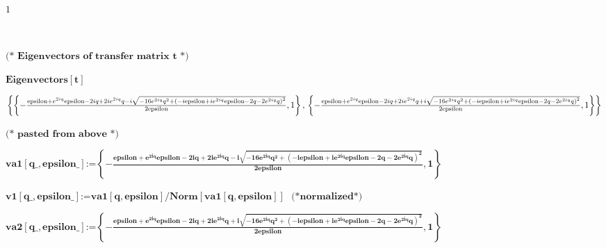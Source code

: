 {\begin{doublespace}
\noindent\(1\)
\end{doublespace}

\begin{doublespace}
\noindent\(\pmb{\text{}}\)
\end{doublespace}

\begin{doublespace}
\noindent\(\pmb{\text{(* Eigenvectors of transfer matrix t *)}}\)
\end{doublespace}

\begin{doublespace}
\noindent\(\pmb{\text{Eigenvectors}[t]}\)
\end{doublespace}

\begin{doublespace}
\noindent\(\left\{\left\{-\frac{\text{epsilon}+e^{2 i q} \text{epsilon}-2 i q+2 i e^{2 i q} q-i \sqrt{-16 e^{2 i q} q^2+\left(-i \text{epsilon}+i
e^{2 i q} \text{epsilon}-2 q-2 e^{2 i q} q\right)^2}}{2 \text{epsilon}},1\right\},
\newline
\left\{-\frac{\text{epsilon}+e^{2 i q} \text{epsilon}-2 i q+2 i
e^{2 i q} q+i \sqrt{-16 e^{2 i q} q^2+\left(-i \text{epsilon}+i e^{2 i q} \text{epsilon}-2 q-2 e^{2 i q} q\right)^2}}{2 \text{epsilon}},1\right\}\right\}\)
\end{doublespace}

\begin{doublespace}
\noindent\(\pmb{\text{(* pasted from above *)}}\)
\end{doublespace}

\begin{doublespace}
\noindent\(\pmb{\text{va1}[\text{q$\_$},\text{epsilon$\_$}]\text{:=}\left\{-\frac{\text{epsilon}+e^{2 i q} \text{epsilon}-2 i q+2 i e^{2 i q} q-i
\sqrt{-16 e^{2 i q} q^2+\left(-i \text{epsilon}+i e^{2 i q} \text{epsilon}-2 q-2 e^{2 i q} q\right)^2}}{2 \text{epsilon}},1\right\}}\)
\end{doublespace}

\begin{doublespace}
\noindent\(\pmb{\text{v1}[\text{q$\_$},\text{epsilon$\_$}]\text{:=}\text{va1}[q,\text{epsilon}]/\text{Norm}[\text{va1}[q,\text{epsilon}]]\text{ 
   }\text{(*} \text{normalized} \text{*)}}\)
\end{doublespace}

\begin{doublespace}
\noindent\(\pmb{\text{va2}[\text{q$\_$},\text{epsilon$\_$}]\text{:=}\left\{-\frac{\text{epsilon}+e^{2 i q} \text{epsilon}-2 i q+2 i e^{2 i q} q+i
\sqrt{-16 e^{2 i q} q^2+\left(-i \text{epsilon}+i e^{2 i q} \text{epsilon}-2 q-2 e^{2 i q} q\right)^2}}{2 \text{epsilon}},1\right\}}\)
\end{doublespace}

}
